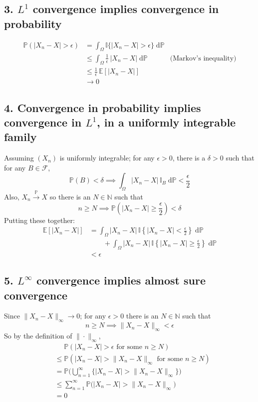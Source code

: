 \documentclass{article}
\newcommand \dP {\;\mathrm{d}\mathbb{P}}
\begin{document}
\subsection*{3. $L^1$ convergence implies convergence in probability}
\begin{align*}
  \mathbb{P}(|X_n - X| > \epsilon)
  &= \int_\Omega \mathbb{I}\{|X_n - X| > \epsilon\} \dP \\
  &\leq \int_\Omega \frac{1}{\epsilon} \, |X_n - X| \dP & \text{(Markov's inequality)} \\
  &\leq \frac{1}{\epsilon} \, \mathbb{E}[|X_n - X|] \\
  &\to 0
\end{align*}

\subsection*{4. Convergence in probability implies convergence in $L^1$,
in a uniformly integrable family}
Assuming $(X_n)$ is uniformly integrable; for any $\epsilon > 0$,
there is a $\delta > 0$ such that for
any $B \in \mathcal{F}$,
$$\mathbb{P}(B) < \delta \implies \int_\Omega |X_n - X| \, \mathbb{I}_B \dP < \frac{\epsilon}{2}$$
%
Also, $X_n \xrightarrow{\mathbb{P}} X$ so there is an $N \in \mathbb{N}$ such that
$$n \geq N \implies \mathbb{P}\left(|X_n - X| \geq \frac{\epsilon}{2}\right) < \delta$$
%
Putting these together:
\begin{align*}
  \mathbb{E}[|X_n - X|]
  &= \int_\Omega |X_n - X| \, \mathbb{I}\left\{|X_n - X| < \frac{\epsilon}{2}\right\} \dP \\
  &\qquad + \int_\Omega |X_n - X| \, \mathbb{I}\left\{|X_n - X| \geq \frac{\epsilon}{2}\right\} \dP \\
  &< \epsilon
\end{align*}



\subsection*{5. $L^\infty$ convergence implies almost sure convergence}
Since $\|X_n - X\|_\infty \to 0$;
for any $\epsilon>0$ there is an $N \in \mathbb{N}$ such that
$$n \geq N \implies \|X_n - X\|_\infty < \epsilon$$
%
So by the definition of $\|\cdot\|_\infty$,
\begin{align*}
  &\quad \,\, \mathbb{P}(|X_n - X| > \epsilon \text{ for some } n \geq N) \\
  &\leq \mathbb{P}(|X_n - X| > \|X_n - X\|_\infty \text{ for some } n \geq N) \\
  &= \mathbb{P}\Big(\bigcup_{n=1}^\infty \big\{|X_n - X| > \|X_n - X\|_\infty \big\} \Big) \\
  &\leq \sum_{n=1}^\infty \mathbb{P}\big(|X_n - X| > \|X_n - X\|_\infty \big) \\
  &= 0
\end{align*}
\end{document}
